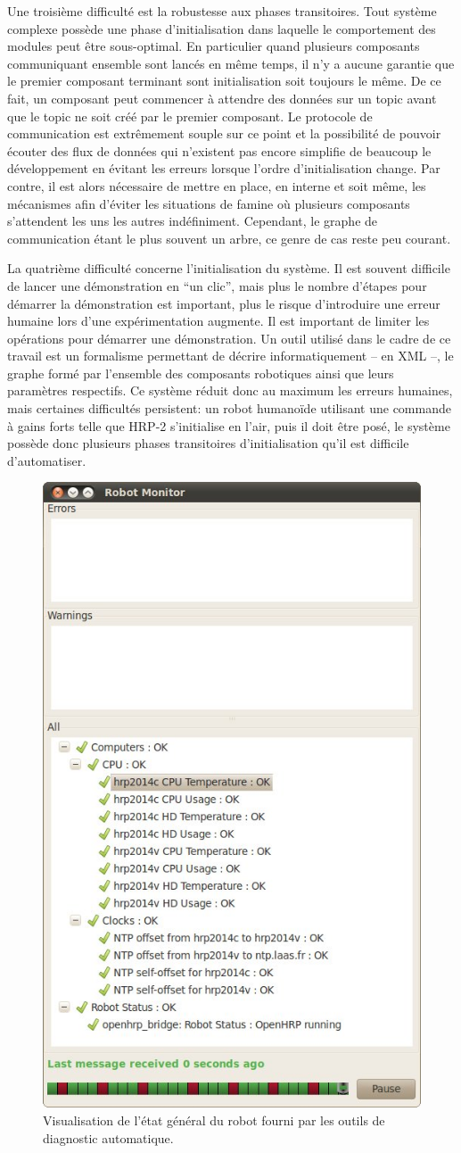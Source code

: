 Une troisième difficulté est la robustesse aux phases
transitoires. Tout système complexe possède une phase d'initialisation
dans laquelle le comportement des modules peut être sous-optimal. En
particulier quand plusieurs composants communiquant ensemble sont
lancés en même temps, il n'y a aucune garantie que le premier
composant terminant sont initialisation soit toujours le même. De ce
fait, un composant peut commencer à attendre des données sur un topic
avant que le topic ne soit créé par le premier composant. Le protocole
de communication est extrêmement souple sur ce point et la possibilité
de pouvoir écouter des flux de données qui n'existent pas encore simplifie de
beaucoup le développement en évitant les erreurs lorsque l'ordre
d'initialisation change. Par contre, il est alors nécessaire de mettre
en place, en interne et soit même, les mécanismes afin d'éviter les
situations de famine où plusieurs composants s'attendent les uns les
autres indéfiniment. Cependant, le graphe de communication étant le
plus souvent un arbre, ce genre de cas reste peu courant.


La quatrième difficulté concerne l'initialisation du système. Il est
souvent difficile de lancer une démonstration en ``un clic'', mais
plus le nombre d'étapes pour démarrer la démonstration est important,
plus le risque d'introduire une erreur humaine lors d'une
expérimentation augmente. Il est important de limiter les opérations
pour démarrer une démonstration. Un outil utilisé dans le cadre de ce
travail est un formalisme permettant de décrire informatiquement -- en
XML --, le graphe formé par l'ensemble des composants
robotiques ainsi que leurs paramètres respectifs. Ce système réduit
donc au maximum les erreurs humaines, mais certaines difficultés
persistent: un robot humanoïde utilisant une commande à gains forts
telle que HRP-2 s'initialise en l'air, puis il doit être posé, le
système possède donc plusieurs phases transitoires d'initialisation
qu'il est difficile d'automatiser.


\begin{figure}[htbp]
  \begin{center}
    \includegraphics[width=.3\linewidth]{src/chap4-integration/hrp2_diagnostics.jpg}
  \end{center}
  \caption{Visualisation de l'état général du robot fourni par les
    outils de diagnostic automatique.\label{fig:diagnostic}}
\end{figure}



